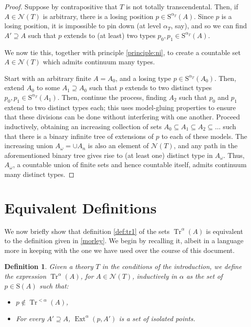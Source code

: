 \documentclass{article}
\newtheorem{definition}[theorem]{Definition}
\theoremstyle{nonumberplain}
\newtheorem{proof}{Proof}
\newcommand{\calN}{\mathcal{N}}
\newcommand{\Stone}{\mathrm{S}}
\DeclareMathOperator{\Tr}{Tr}
\DeclareMathOperator{\Ext}{Ext}
\begin{document}
\begin{proof}
Suppose by contrapositive that $T$ is not totally transcendental. Then, if $A \in \calN(T)$ is arbitrary, there is a losing position $p \in \Stone^{\alpha_T}(A)$. Since $p$ is a losing position, it is impossible to pin down (at level $\alpha_T$, say), and so we can find $A' \supseteq A$ such that $p$ extends to (at least) two types $p_0, p_1 \in \Stone^{\alpha_T}(A)$.

We now tie this, together with principle \ref{principle:ni}, to create a countable set $A \in \calN(T)$ which admits continuum many types.

Start with an arbitrary finite $A = A_0$, and a losing type $p \in \Stone^{\alpha_T}(A_0)$. Then, extend $A_0$ to some $A_1 \supseteq A_0$ such that $p$ extends to two distinct types $p_0, p_1 \in \Stone^{\alpha_T}(A_1)$. Then, continue the process, finding $A_2$ such that $p_0$ and $p_1$ extend to two distinct types each; this uses model-gluing properties to ensure that these divisions can be done without interfering with one another. Proceed inductively, obtaining an increasing collection of sets $A_0 \subseteq A_1 \subseteq A_2 \subseteq \dots$ such that there is a binary infinite tree of extensions of $p$ to each of these models. The increasing union $A_\omega = \cup A_n$ is also an element of $\calN(T)$, and any path in the aforementioned binary tree gives rise to (at least one) distinct type in $A_\omega$. Thus, $A_\omega$, a countable union of finite sets and hence countable itself, admits continuum many distinct types.
\end{proof}

\section{Equivalent Definitions}

We now briefly show that definition \ref{def:tr1} of the sets $\Tr^\alpha(A)$ is equivalent to the definition given in \ref{morley}. We begin by recalling it, albeit in a language more in keeping with the one we have used over the course of this document.

\begin{definition}\label{def:tr2}
Given a theory $T$ in the conditions of the introduction, we define the expression $\Tr^\alpha(A)$, for $A \in \calN(T)$, inductively in $\alpha$ as the set of $p \in \Stone(A)$ such that:
\begin{itemize}
\item $p \not\in \Tr^{<\alpha}(A)$,
\item For every $A' \supseteq A$, $\Ext^\alpha(p,A')$ is a set of isolated points.
\end{itemize}
\end{definition}
\end{document}

